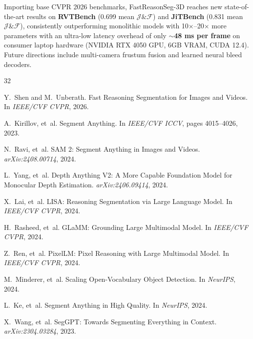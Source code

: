\documentclass[10pt,twocolumn,letterpaper]{article}
\begin{document}
Importing base CVPR 2026 benchmarks, FastReasonSeg-3D reaches new state-of-the-art results on \textbf{RVTBench} (0.699 mean $\mathcal{J}\&\mathcal{F}$) and \textbf{JiTBench} (0.831 mean $\mathcal{J}\&\mathcal{F}$), consistently outperforming monolithic models with 10$\times$--20$\times$ more parameters with an ultra-low latency overhead of only \textbf{$\sim$48 ms per frame} on consumer laptop hardware (NVIDIA RTX 4050 GPU, 6GB VRAM, CUDA 12.4). Future directions include multi-camera frustum fusion and learned neural bleed decoders.

\begin{thebibliography}{32}
\fontsize{6.8pt}{7.8pt}\selectfont
\setlength{\itemsep}{0pt}
\setlength{\parsep}{0pt}

Y.~Shen and M.~Unberath.
\newblock Fast Reasoning Segmentation for Images and Videos.
\newblock In \emph{IEEE/CVF CVPR}, 2026.

A.~Kirillov, et~al.
\newblock Segment Anything.
\newblock In \emph{IEEE/CVF ICCV}, pages 4015--4026, 2023.

N.~Ravi, et~al.
\newblock SAM 2: Segment Anything in Images and Videos.
\newblock \emph{arXiv:2408.00714}, 2024.

L.~Yang, et~al.
\newblock Depth Anything V2: A More Capable Foundation Model for Monocular Depth Estimation.
\newblock \emph{arXiv:2406.09414}, 2024.

X.~Lai, et~al.
\newblock LISA: Reasoning Segmentation via Large Language Model.
\newblock In \emph{IEEE/CVF CVPR}, 2024.

H.~Rasheed, et~al.
\newblock GLaMM: Grounding Large Multimodal Model.
\newblock In \emph{IEEE/CVF CVPR}, 2024.

Z.~Ren, et~al.
\newblock PixelLM: Pixel Reasoning with Large Multimodal Model.
\newblock In \emph{IEEE/CVF CVPR}, 2024.

M.~Minderer, et~al.
\newblock Scaling Open-Vocabulary Object Detection.
\newblock In \emph{NeurIPS}, 2024.

L.~Ke, et~al.
\newblock Segment Anything in High Quality.
\newblock In \emph{NeurIPS}, 2024.

X.~Wang, et~al.
\newblock SegGPT: Towards Segmenting Everything in Context.
\newblock \emph{arXiv:2304.03284}, 2023.


\end{thebibliography}
\end{document}
